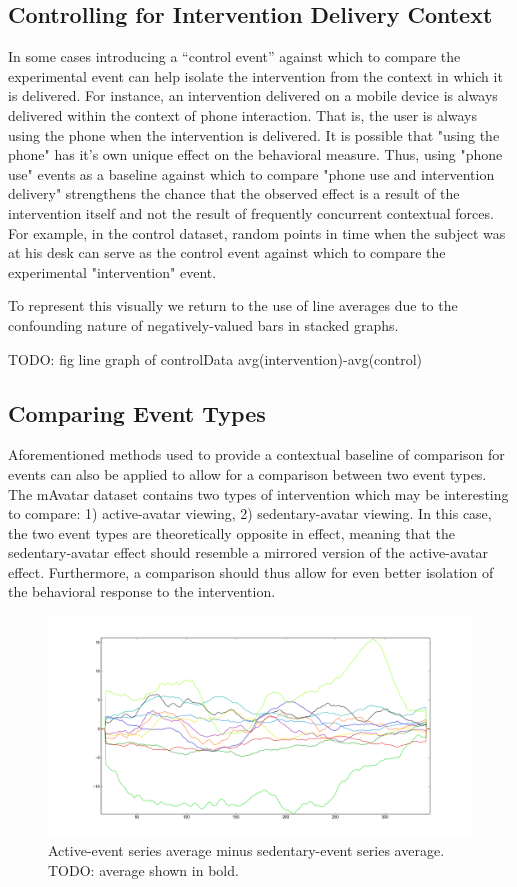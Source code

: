 \documentclass[preprint,journal]{vgtc}       %
\begin{document}
\subsection{Controlling for Intervention Delivery Context}
In some cases introducing a “control event” against which to compare the experimental event can help isolate the intervention from the context in which it is delivered. 
For instance, an intervention delivered on a mobile device is always delivered within the context of phone interaction.
That is, the user is always using the phone when the intervention is delivered. 
It is possible that "using the phone" has it's own unique effect on the behavioral measure. 
Thus, using "phone use" events as a baseline against which to compare "phone use and intervention delivery" strengthens the chance that the observed effect is a result of the intervention itself and not the result of frequently concurrent contextual forces.
For example, in the control dataset, random points in time when the subject was at his desk can serve as the control event against which to compare the experimental "intervention" event.

To represent this visually we return to the use of line averages due to the confounding nature of negatively-valued bars in stacked graphs.

TODO: fig line graph of controlData avg(intervention)-avg(control)


\subsection{Comparing Event Types}
Aforementioned methods used to provide a contextual baseline of comparison for events can also be applied to allow for a comparison between two event types. 
The mAvatar dataset contains two types of intervention which may be interesting to compare: 1) active-avatar viewing, 2) sedentary-avatar viewing.
In this case, the two event types are theoretically opposite in effect, meaning that the sedentary-avatar effect should resemble a mirrored version of the active-avatar effect.
Furthermore, a comparison should thus allow for even better isolation of the behavioral response to the intervention.

\begin{figure}
\centering
\includegraphics[width=0.9\columnwidth]{./img/nonexclude_steps_60m_after_view_event_avg19.png}
\caption{Active-event series average minus sedentary-event series average. TODO: average shown in bold.}
\label{fig:mAvatarDifference}
\end{figure}
\end{document}
